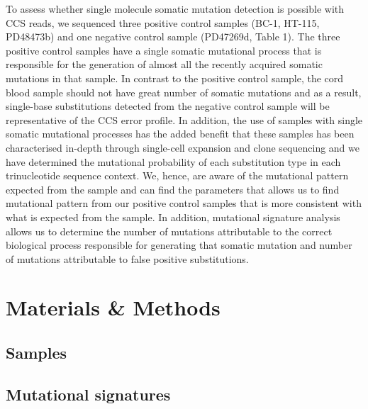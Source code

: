 To assess whether single molecule somatic mutation detection is possible with CCS reads, we sequenced three positive control samples (BC-1, HT-115, PD48473b) and one negative control sample (PD47269d, Table 1). The three positive control samples have a single somatic mutational process that is responsible for the generation of almost all the recently acquired somatic mutations in that sample. In contrast to the positive control sample, the cord blood sample should not have great number of somatic mutations and as a result, single-base substitutions detected from the negative control sample will be representative of the CCS error profile. In addition, the use of samples with single somatic mutational processes has the added benefit that these samples has been characterised in-depth through single-cell expansion and clone sequencing and we have determined the mutational probability of each substitution type in each trinucleotide sequence context. We, hence, are aware of the mutational pattern expected from the sample and can find the parameters that allows us to find mutational pattern from our positive control samples that is more consistent with what is expected from the sample. In addition, mutational signature analysis allows us to determine the number of mutations attributable to the correct biological process responsible for generating that somatic mutation and number of mutations attributable to false positive substitutions.  






\section{Materials \& Methods}
\subsection{Samples}
\subsection{Mutational signatures}
